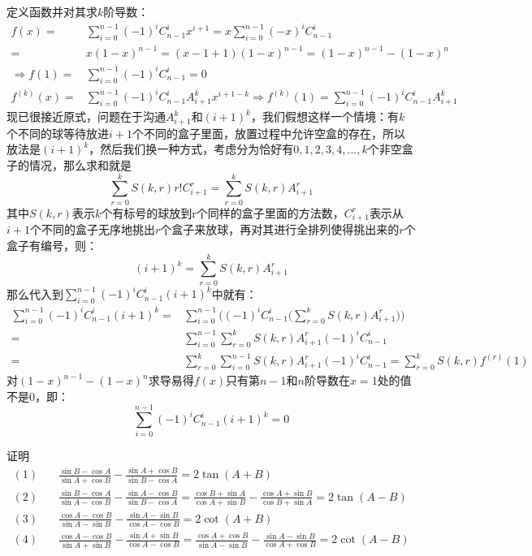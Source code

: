 \begin{solution}
    定义函数并对其求$k$阶导数：\begin{align*}f(x)=&\displaystyle\sum_{i=0}^{n-1}(-1)^{i}C_{n-1}^{i}x^{i+1}
        =\displaystyle x\sum_{i=0}^{n-1}(-x)^{i}C_{n-1}^{i}\\
        =&\displaystyle x(1-x)^{n-1}
        =(x-1+1)(1-x)^{n-1}
        =(1-x)^{n-1}-(1-x)^n\\
    \Rightarrow f(1)=&\displaystyle\sum_{i=0}^{n-1}(-1)^{i}C_{n-1}^{i}=0\\
     f^{(k)}(x)=&\displaystyle\sum_{i=0}^{n-1}(-1)^{i}C_{n-1}^{i}A_{i+1}^{k}x^{i+1-k}\Rightarrow
     f^{(k)}(1)=\displaystyle\sum_{i=0}^{n-1}(-1)^{i}C_{n-1}^{i}A_{i+1}^{k}
    \end{align*}
    现已很接近原式，问题在于沟通$A_{i+1}^{k}$和${(i+1)}^{k}$，我们假想这样一个情境：有$k$个不同的球等待放进$i+1$个不同的盒子里面，放置过程中允许空盒的存在，所以放法是${(i+1)}^{k}$，然后我们换一种方式，考虑分为恰好有$0,1,2,3,4,...,k$个非空盒子的情况，那么求和就是\[\sum_{r=0}^kS(k,r)r!C_{i+1}^r=\sum_{r=0}^kS(k,r)A_{i+1}^r\]
    其中$S(k,r)$表示$k$个有标号的球放到r个同样的盒子里面的方法数，$C_{i+1}^r$表示从$i+1$个不同的盒子无序地挑出$r$个盒子来放球，再对其进行全排列使得挑出来的$r$个盒子有编号，则：\[(i+1)^{k}=\sum_{r=0}^kS(k,r)A_{i+1}^r
    \]
    那么代入到$\displaystyle \sum_{i=0}^{n-1}(-1)^{i}C_{n-1}^{i}(i+1)^k$中就有：\begin{align*}
    \sum_{i=0}^{n-1}(-1)^{i}C_{n-1}^{i}(i+1)^k=&\sum_{i=0}^{n-1}\bigg((-1)^{i}C_{n-1}^{i}\bigg(\sum_{r=0}^kS(k,r)A_{i+1}^r\bigg)\bigg)\\=&\sum_{i=0}^{n-1}\sum_{r=0}^kS(k,r)A_{i+1}^r(-1)^{i}C_{n-1}^{i}\\=&\sum_{r=0}^k\sum_{i=0}^{n-1}S(k,r)A_{i+1}^r(-1)^{i}C_{n-1}^{i}=\sum_{r=0}^kS(k,r)f^{(r)}(1)
    \end{align*}
    对$(1-x)^{n-1}-(1-x)^n$求导易得$f(x)$只有第$n-1$和$n$阶导数在$x=1$处的值不是$0$，即：\[\sum_{i=0}^{n-1}(-1)^{i}C_{n-1}^{i}(i+1)^k=0
    \]
\end{solution}
\begin{example}{证明}{}
    \vspace{-15pt}\begin{align*}
    (1)\quad&\frac{\sin B - \cos A}{\sin A + \cos B} - \frac{\sin A + \cos B}{\sin B - \cos A} = 2\tan(A+B)\\
    (2)\quad&\frac{\sin B - \cos A}{\sin A - \cos B} - \frac{\sin A - \cos B}{\sin B - \cos A} = \frac{\cos B + \sin A}{\cos A + \sin B} - \frac{\cos A + \sin B}{\cos B + \sin A} = 2\tan(A-B)\\
    (3)\quad&\frac{\cos A - \cos B}{\sin A - \sin B} - \frac{\sin A - \sin B}{\cos A - \cos B} = 2\cot(A+B)\\
    (4)\quad&\frac{\cos A - \cos B}{\sin A + \sin B} - \frac{\sin A + \sin B}{\cos A - \cos B} = \frac{\cos A + \cos B}{\sin A - \sin B} - \frac{\sin A - \sin B}{\cos A + \cos B} = 2\cot(A-B)\end{align*}
\end{example}

